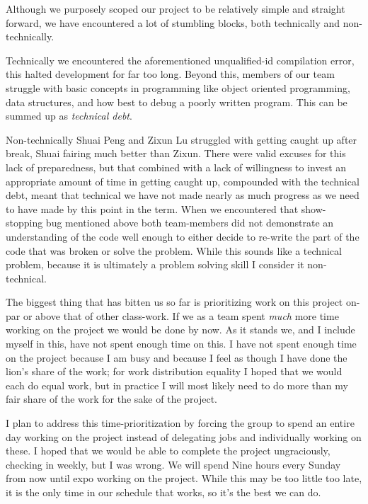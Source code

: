 Although we purposely scoped our project to be relatively simple and straight forward, we have encountered a lot of stumbling blocks, both technically and non-technically.

Technically we encountered the aforementioned unqualified-id compilation error, this halted development for far too long.
Beyond this, members of our team struggle with basic concepts in programming like object oriented programming, data structures, and how best to debug a poorly written program.
This can be summed up as \textit{technical debt}.

Non-technically Shuai Peng and Zixun Lu struggled with getting caught up after break, Shuai fairing much better than Zixun.
There were valid excuses for this lack of preparedness, but that combined with a lack of willingness to invest an appropriate amount of time in getting caught up, compounded with the technical debt, meant that technical we have not made nearly as much progress as we need to have made by this point in the term.
When we encountered that show-stopping bug mentioned above both team-members did not demonstrate an understanding of the code well enough to either decide to re-write the part of the code that was broken or solve the problem.
While this sounds like a technical problem, because it is ultimately a problem solving skill I consider it non-technical.

The biggest thing that has bitten us so far is prioritizing work on this project on-par or above that of other class-work.
If we as a team spent \textit{much} more time working on the project we would be done by now.
As it stands we, and I include myself in this, have not spent enough time on this.
I have not spent enough time on the project because I am busy and because I feel as though I have done the lion's share of the work; for work distribution equality I hoped that we would each do equal work, but in practice I will most likely need to do more than my fair share of the work for the sake of the project.

I plan to address this time-prioritization by forcing the group to spend an entire day working on the project instead of delegating jobs and individually working on these.
I hoped that we would be able to complete the project ungraciously, checking in weekly, but I was wrong.
We will spend Nine hours every Sunday from now until expo working on the project.
While this may be too little too late, it is the only time in our schedule that works, so it's the best we can do.

